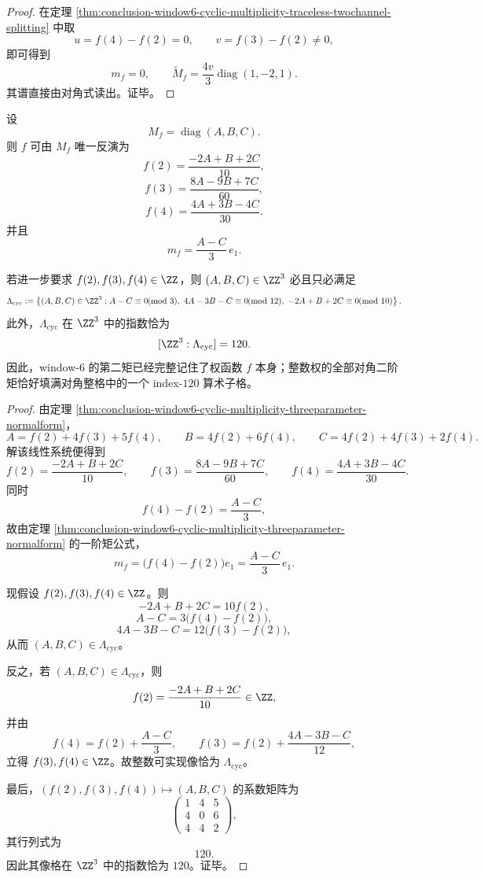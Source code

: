 \begin{proof}
在定理 \ref{thm:conclusion-window6-cyclic-multiplicity-traceless-twochannel-splitting} 中取
\[
u=f(4)-f(2)=0,
\qquad
v=f(3)-f(2)\neq 0,
\]
即可得到
\[
m_f=0,
\qquad
\widetilde M_f
=
\frac{4v}{3}\operatorname{diag}(1,-2,1).
\]
其谱直接由对角式读出。证毕。
\end{proof}

\begin{theorem}\label{thm:conclusion-window6-cyclic-multiplicity-secondmoment-lattice-inversion}
设
\[
M_f=\operatorname{diag}(A,B,C).
\]
则 \(f\) 可由 \(M_f\) 唯一反演为
\[
f(2)=\frac{-2A+B+2C}{10},
\]
\[
f(3)=\frac{8A-9B+7C}{60},
\]
\[
f(4)=\frac{4A+3B-4C}{30}.
\]
并且
\[
m_f=\frac{A-C}{3}\,e_1.
\]

若进一步要求 \(f(2),f(3),f(4)\in\ZZ\)，则 \((A,B,C)\in\ZZ^3\) 必且只必满足
\[
\Lambda_{\mathrm{cyc}}
:=
\left\{
(A,B,C)\in\ZZ^3:
A-C\equiv 0 \!\!\!\pmod 3,\
4A-3B-C\equiv 0 \!\!\!\pmod{12},\
-2A+B+2C\equiv 0 \!\!\!\pmod{10}
\right\}.
\]
此外，\(\Lambda_{\mathrm{cyc}}\) 在 \(\ZZ^3\) 中的指数恰为
\[
[\ZZ^3:\Lambda_{\mathrm{cyc}}]=120.
\]
因此，window-\(6\) 的第二矩已经完整记住了权函数 \(f\) 本身；整数权的全部对角二阶矩恰好填满对角整格中的一个 index-\(120\) 算术子格。
\end{theorem}

\begin{proof}
由定理 \ref{thm:conclusion-window6-cyclic-multiplicity-threeparameter-normalform}，
\[
A=f(2)+4f(3)+5f(4),\qquad
B=4f(2)+6f(4),\qquad
C=4f(2)+4f(3)+2f(4).
\]
解该线性系统便得到
\[
f(2)=\frac{-2A+B+2C}{10},\qquad
f(3)=\frac{8A-9B+7C}{60},\qquad
f(4)=\frac{4A+3B-4C}{30}.
\]
同时
\[
f(4)-f(2)=\frac{A-C}{3},
\]
故由定理 \ref{thm:conclusion-window6-cyclic-multiplicity-threeparameter-normalform} 的一阶矩公式，
\[
m_f=\bigl(f(4)-f(2)\bigr)e_1=\frac{A-C}{3}\,e_1.
\]

现假设 \(f(2),f(3),f(4)\in\ZZ\)。则
\[
-2A+B+2C=10f(2),
\]
\[
A-C=3\bigl(f(4)-f(2)\bigr),
\]
\[
4A-3B-C=12\bigl(f(3)-f(2)\bigr),
\]
从而 \((A,B,C)\in\Lambda_{\mathrm{cyc}}\)。

反之，若 \((A,B,C)\in\Lambda_{\mathrm{cyc}}\)，则
\[
f(2)=\frac{-2A+B+2C}{10}\in\ZZ,
\]
并由
\[
f(4)=f(2)+\frac{A-C}{3},
\qquad
f(3)=f(2)+\frac{4A-3B-C}{12},
\]
立得 \(f(3),f(4)\in\ZZ\)。故整数可实现像恰为 \(\Lambda_{\mathrm{cyc}}\)。

最后，\((f(2),f(3),f(4))\mapsto(A,B,C)\) 的系数矩阵为
\[
\begin{pmatrix}
1&4&5\\
4&0&6\\
4&4&2
\end{pmatrix},
\]
其行列式为
\[
120.
\]
因此其像格在 \(\ZZ^3\) 中的指数恰为 \(120\)。证毕。
\end{proof}

